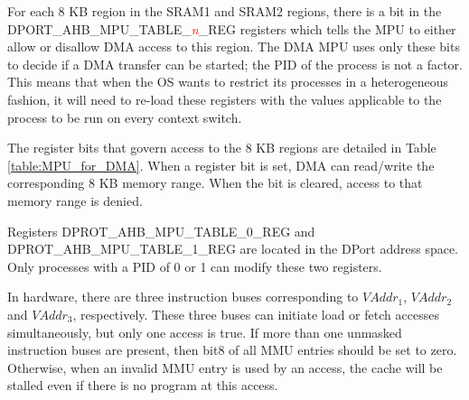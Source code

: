 For each 8 KB region in the SRAM1 and SRAM2 regions, there is a bit in the DPORT\_AHB\_MPU\_TABLE\_\textcolor{red}{\it{n}}\_REG registers which tells the MPU to either allow or disallow DMA access to this region. The DMA MPU uses only these bits to decide if a DMA transfer can be started; the PID of the process is not a factor. This means that when the OS wants to restrict its processes in a heterogeneous fashion, it will need to re-load these registers with the values applicable to the process to be run on every context switch.

The register bits that govern access to the 8 KB regions are detailed in Table \ref{table:MPU_for_DMA}. When a register bit is set, DMA can read/write the corresponding 8 KB memory range. When the bit is cleared, access to that memory range is denied.



Registers DPROT\_AHB\_MPU\_TABLE\_0\_REG and DPROT\_AHB\_MPU\_TABLE\_1\_REG are located in the DPort address space.
Only processes with a PID of 0 or 1 can modify these two registers.

\begin{tiplisting}
In hardware, there are three instruction buses corresponding to $VAddr_1$, $VAddr_2$ and $VAddr_3$, respectively. These three buses can initiate load or fetch accesses simultaneously, but only one access is true. If more than one unmasked instruction buses are present, then bit8 of all MMU entries should be set to zero. Otherwise, when an invalid MMU entry is used by an access, the cache will be stalled even if there is no program at this access.

\end{tiplisting}